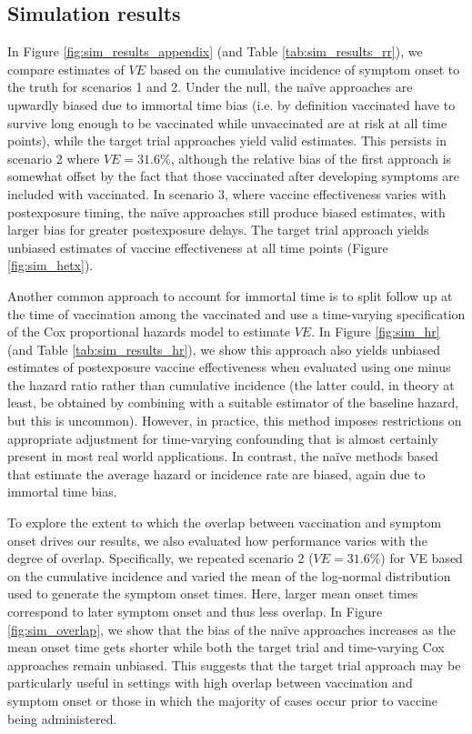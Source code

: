 \begin{appendices}
\begin{refsection}
    \subsection*{Simulation results}
    In Figure \ref{fig:sim_results_appendix} (and Table \ref{tab:sim_results_rr}), we compare estimates of $VE$ based on the cumulative incidence of symptom onset to the truth for scenarios 1 and 2. Under the null, the na\"{i}ve approaches are upwardly biased due to immortal time bias (i.e. by definition vaccinated have to survive long enough to be vaccinated while unvaccinated are at risk at all time points), while the target trial approaches yield valid estimates. This persists in scenario 2 where $VE = 31.6\%$, although the relative bias of the first approach is somewhat offset by the fact that those vaccinated after developing symptoms are included with vaccinated. In scenario 3, where vaccine effectiveness varies with postexposure timing, the na\"{i}ve approaches still produce biased estimates, with larger bias for greater postexposure delays. The target trial approach yields unbiased estimates of vaccine effectiveness at all time points (Figure \ref{fig:sim_hetx}). 

    Another common approach to account for immortal time is to split follow up at the time of vaccination among the vaccinated and use a time-varying specification of the Cox proportional hazards model to estimate $VE$. In Figure \ref{fig:sim_hr} (and Table \ref{tab:sim_results_hr}), we show this approach also yields unbiased estimates of postexposure vaccine effectiveness when evaluated using one minus the hazard ratio rather than cumulative incidence (the latter could, in theory at least, be obtained by combining with a suitable estimator of the baseline hazard, but this is uncommon). However, in practice, this method imposes restrictions on appropriate adjustment for time-varying confounding that is almost certainly present in most real world applications. In contrast, the na\"{i}ve methods based that estimate the average hazard or incidence rate are biased, again due to immortal time bias. 

    To explore the extent to which the overlap between vaccination and symptom onset drives our results, we also evaluated how performance varies with the degree of overlap. Specifically, we repeated scenario 2 ($VE = 31.6\%$) for VE based on the cumulative incidence and varied the mean of the log-normal distribution used to generate the symptom onset times. Here, larger mean onset times correspond to later symptom onset and thus less overlap. In Figure \ref{fig:sim_overlap}, we show that the bias of the na\"{i}ve approaches increases as the mean onset time gets shorter while both the target trial and time-varying Cox approaches remain unbiased. This suggests that the target trial approach may be particularly useful in settings with high overlap between vaccination and symptom onset or those in which the majority of cases occur prior to vaccine being administered.


\end{refsection}
\end{appendices}
